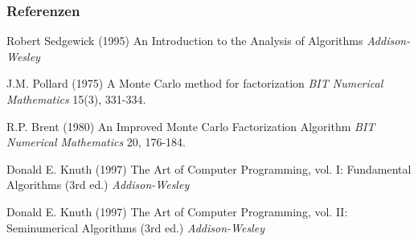 \documentclass{beamer}
\begin{document}
\begin{frame}
	\frametitle{Referenzen}
		\footnotesize{
			\begin{thebibliography}{99}
				 Robert Sedgewick (1995)
				\newblock An Introduction to the Analysis of Algorithms
				\newblock \emph{Addison-Wesley}
			\end{thebibliography}
			\begin{thebibliography}{99}
				 J.M. Pollard (1975)
				\newblock A Monte Carlo method for factorization
				\newblock \emph{BIT Numerical Mathematics} 15(3), 331-334.
			\end{thebibliography}
			\begin{thebibliography}{99}
				 R.P. Brent (1980)
				\newblock An Improved Monte Carlo Factorization Algorithm
				\newblock \emph{BIT Numerical Mathematics} 20, 176-184.
			\end{thebibliography}
			\begin{thebibliography}{99}
				 Donald E. Knuth (1997)
				\newblock The Art of Computer Programming, vol. I: Fundamental Algorithms (3rd ed.)
				\newblock \emph{Addison-Wesley}
			\end{thebibliography}
			\begin{thebibliography}{99}
				 Donald E. Knuth (1997)
				\newblock The Art of Computer Programming, vol. II: Seminumerical Algorithms (3rd ed.)
				\newblock \emph{Addison-Wesley}
			\end{thebibliography}
		}
\end{frame}


\end{document}
